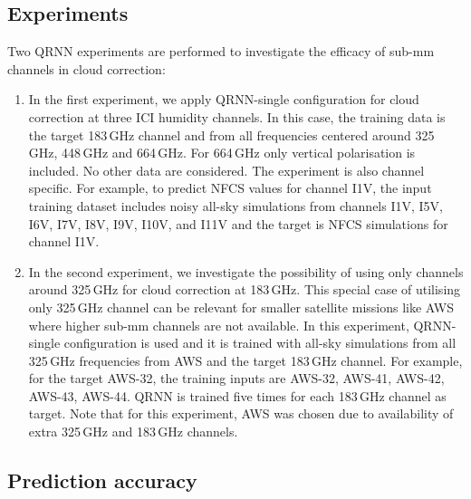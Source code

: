 \documentclass[amt, manuscript]{copernicus}
\begin{document}
\subsection{Experiments}
%
Two QRNN experiments are performed to investigate the efficacy of sub-mm channels in cloud correction: 
\begin{enumerate}
	\item In the first experiment, we apply QRNN-single configuration for cloud correction at three ICI humidity channels. In this case, the training data is the target 183\,GHz channel and from all frequencies  centered around 325\,GHz, 448\,GHz and 664\,GHz. For 664\,GHz only vertical polarisation is included. No other data are considered. The experiment is also channel specific. For example, to predict NFCS values for channel I1V, the input training dataset includes noisy all-sky simulations from channels I1V, I5V, I6V, I7V, I8V, I9V, I10V, and I11V and the target is NFCS simulations for channel I1V.
	
	\item In the second experiment, we investigate the possibility of using only channels around 325\,GHz for cloud correction at 183\,GHz. This special case of utilising only 325\,GHz channel can be relevant for smaller satellite missions like AWS where higher sub-mm channels are not available. In this experiment, QRNN-single configuration is used and it is trained with all-sky simulations from all 325\,GHz frequencies from AWS and the target 183\,GHz channel. For example, for the target AWS-32, the training inputs are AWS-32, AWS-41, AWS-42, AWS-43, AWS-44. QRNN is trained five times for each 183\,GHz channel as target. Note that for this experiment, AWS was chosen due to availability of extra 325\,GHz and 183\,GHz channels. 	
\end{enumerate}	

\subsection{Prediction accuracy}
\end{document}
